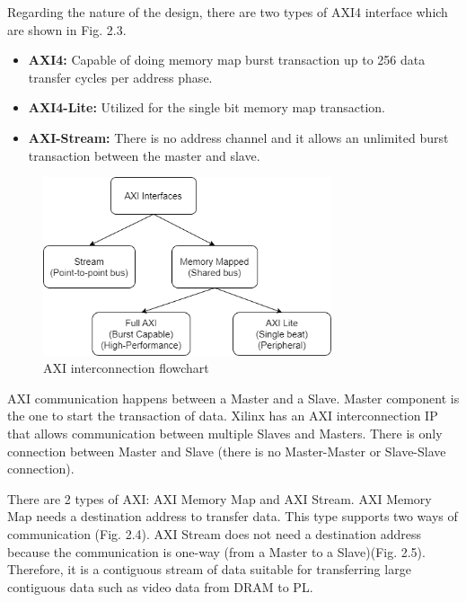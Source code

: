 \documentclass[a4paper, 12pt]{report}
\begin{document}
Regarding the nature of the design, there are two types of AXI4 interface which are shown in Fig. 2.3. 
\begin{itemize}
\item \textbf{AXI4:} Capable of doing memory map burst transaction up to 256 data transfer cycles per address phase.
\item \textbf{AXI4-Lite:} Utilized for the single bit memory map transaction.
\item \textbf{AXI-Stream:} There is no address channel and it allows an unlimited burst transaction between the master and slave.
\end{itemize}
\begin{center}
    \begin{figure}[H]
        \begin{center}
            \includegraphics[width=8.5cm]{picture/AXI/axi2.drawio.png}
        \end{center}
        \caption{AXI interconnection flowchart}
        \label{ref Figure}
    \end{figure}
\end{center}

AXI communication happens between a Master and a Slave. Master component is the one to start the transaction of data. Xilinx has an AXI interconnection IP that allows communication between multiple Slaves and Masters. There is only connection between Master and Slave (there is no Master-Master or Slave-Slave connection).

There are 2 types of AXI: AXI Memory Map and AXI Stream. AXI Memory Map needs a destination address to transfer data. This type supports two ways of communication (Fig. 2.4). AXI Stream does not need a destination address because the communication is one-way (from a Master to a Slave)(Fig. 2.5). Therefore, it is a contiguous stream of data suitable for transferring large contiguous data such as video data from DRAM to PL.
\end{document}
